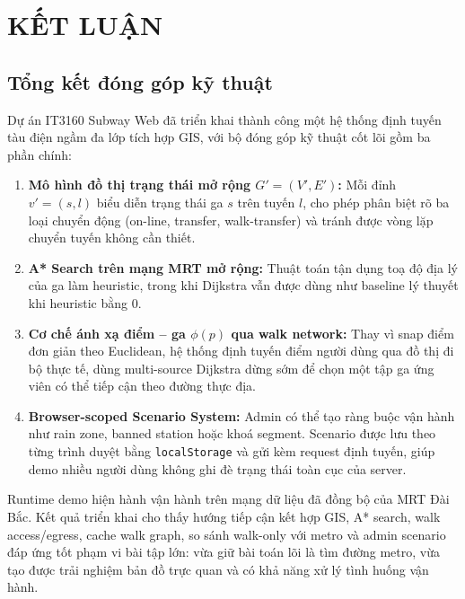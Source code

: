 ﻿\documentclass[../DoAn.tex]{subfiles}
\begin{document}
\chapter{KẾT LUẬN}
\label{chapter:conclusion}

\section{Tổng kết đóng góp kỹ thuật}
Dự án IT3160 Subway Web đã triển khai thành công một hệ thống định tuyến tàu điện ngầm đa lớp tích hợp GIS, với bộ đóng góp kỹ thuật cốt lõi gồm ba phần chính:

\begin{enumerate}
    \item \textbf{Mô hình đồ thị trạng thái mở rộng $G' = (V', E')$:} Mỗi đỉnh $v' = (s, l)$ biểu diễn trạng thái ga $s$ trên tuyến $l$, cho phép phân biệt rõ ba loại chuyển động (on-line, transfer, walk-transfer) và tránh được vòng lặp chuyển tuyến không cần thiết.
    \item \textbf{A* Search trên mạng MRT mở rộng:} Thuật toán tận dụng toạ độ địa lý của ga làm heuristic, trong khi Dijkstra vẫn được dùng như baseline lý thuyết khi heuristic bằng 0.
    \item \textbf{Cơ chế ánh xạ điểm -- ga $\phi(p)$ qua walk network:} Thay vì snap điểm đơn giản theo Euclidean, hệ thống định tuyến điểm người dùng qua đồ thị đi bộ thực tế, dùng multi-source Dijkstra dừng sớm để chọn một tập ga ứng viên có thể tiếp cận theo đường thực địa.
    \item \textbf{Browser-scoped Scenario System:} Admin có thể tạo ràng buộc vận hành như rain zone, banned station hoặc khoá segment. Scenario được lưu theo từng trình duyệt bằng \texttt{localStorage} và gửi kèm request định tuyến, giúp demo nhiều người dùng không ghi đè trạng thái toàn cục của server.
\end{enumerate}

Runtime demo hiện hành vận hành trên mạng dữ liệu đã đồng bộ của MRT Đài Bắc. Kết quả triển khai cho thấy hướng tiếp cận kết hợp GIS, A* search, walk access/egress, cache walk graph, so sánh walk-only với metro và admin scenario đáp ứng tốt phạm vi bài tập lớn: vừa giữ bài toán lõi là tìm đường metro, vừa tạo được trải nghiệm bản đồ trực quan và có khả năng xử lý tình huống vận hành.
\end{document}
